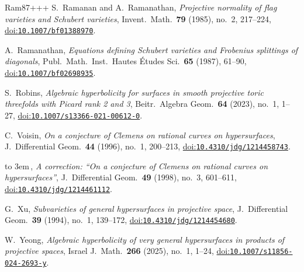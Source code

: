 \documentclass[10pt,a4paper]{article}
\numberwithin{equation}{section}
\theoremstyle{definition}
\theoremstyle{remark}
\providecommand{\doi}[1]{\href{https://doi.org/#1}{doi:\nolinkurl{#1}}}
\providecommand{\bysame}{\leavevmode\hbox to 3em{\hrulefill}\,}
\begin{document}
\begin{thebibliography}{Ram87+++}
S.~Ramanan and A.~Ramanathan, \emph{Projective normality of flag varieties and
  Schubert varieties}, Invent.\ Math.\ \textbf{79} (1985), no.~2, 217--224, \doi{10.1007/bf01388970}.

A.~Ramanathan, \emph{Equations defining Schubert varieties and Frobenius
  splittings of diagonals}, Publ.\ Math.\ Inst.\ Hautes \'Etudes Sci.\
  \textbf{65} (1987), 61--90, \doi{10.1007/bf02698935}.

S.~Robins, \emph{Algebraic hyperbolicity for surfaces in smooth projective
  toric threefolds with Picard rank 2 and 3}, Beitr.\ Algebra Geom.\ \textbf{64}
  (2023), no.~1, 1--27, \doi{10.1007/s13366-021-00612-0}.

C.~Voisin, \emph{On a conjecture of Clemens on rational curves on
  hypersurfaces}, J.~Differential Geom.\ \textbf{44} (1996), no.~1,
  200--213,
  \doi{10.4310/jdg/1214458743}.

\bysame, \emph{A correction: ``On a conjecture of Clemens on rational curves on
  hypersurfaces''}, J.~Differential Geom.\ \textbf{49} (1998), no.~3,
601--611, \doi{10.4310/jdg/1214461112}.

G.~Xu, \emph{Subvarieties of general hypersurfaces in projective space}, J.~Differential Geom.\ \textbf{39} (1994), no.~1, 139--172,
  \doi{10.4310/jdg/1214454680}.

W.~Yeong, \emph{Algebraic hyperbolicity of very general hypersurfaces in
  products of projective spaces}, Israel J.~Math.\ \textbf{266}
  (2025), no.~1, 1--24, \doi{10.1007/s11856-024-2693-y}.

\end{thebibliography}
\end{document}
